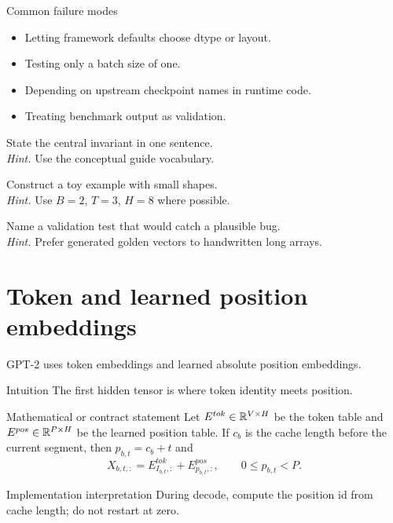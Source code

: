 \begin{warningbox}{Common failure modes}
\begin{itemize}
\item Letting framework defaults choose dtype or layout.
\item Testing only a batch size of one.
\item Depending on upstream checkpoint names in runtime code.
\item Treating benchmark output as validation.
\end{itemize}
\end{warningbox}

\begin{chapterexercises}
\item State the central invariant in one sentence.\\
\textit{Hint.} Use the conceptual guide vocabulary.
\item Construct a toy example with small shapes.\\
\textit{Hint.} Use $B=2$, $T=3$, $H=8$ where possible.
\item Name a validation test that would catch a plausible bug.\\
\textit{Hint.} Prefer generated golden vectors to handwritten long arrays.
\end{chapterexercises}

\chapter{Token and learned position embeddings}
\label{ch:gpt2-embeddings}
GPT-2 uses token embeddings and learned absolute position embeddings.



\begin{intuitionbox}{Intuition}
The first hidden tensor is where token identity meets position.
\end{intuitionbox}

\begin{definitionbox}{Mathematical or contract statement}
Let \(E^{tok}\in\mathbb{R}^{V\times H}\) be the token table and \(E^{pos}\in\mathbb{R}^{P\times H}\) be the learned position table. If \(c_b\) is the cache length before the current segment, then \(p_{b,t}=c_b+t\) and
\[
X_{b,t,:}=E^{tok}_{I_{b,t},:}+E^{pos}_{p_{b,t},:},
\qquad 0\leq p_{b,t}<P.
\]
\end{definitionbox}

\begin{implementationbox}{Implementation interpretation}
During decode, compute the position id from cache length; do not restart at zero.
\end{implementationbox}

